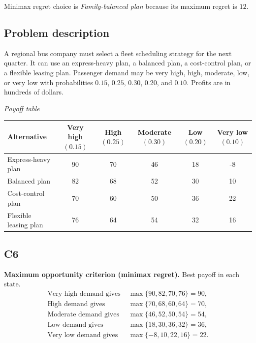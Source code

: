 \begin{ExamProblems}
		Minimax regret choice is \emph{Family-balanced plan} because its maximum regret is $12$.

		\item
		\subsection*{Problem description}
		A regional bus company must select a fleet scheduling strategy for the next quarter. It can use an express-heavy plan, a balanced plan, a cost-control plan, or a flexible leasing plan. Passenger demand may be very high, high, moderate, low, or very low with probabilities $0.15$, $0.25$, $0.30$, $0.20$, and $0.10$. Profits are in hundreds of dollars.

		\begin{center}
			\textit{Payoff table}\\
			\begin{tabular}{l c c c c c}
				\toprule
				Alternative & Very high $(0.15)$ & High $(0.25)$ & Moderate $(0.30)$ & Low $(0.20)$ & Very low $(0.10)$ \\
				\midrule
				Express-heavy plan & 90 & 70 & 46 & 18 & -8 \\
				Balanced plan & 82 & 68 & 52 & 30 & 10 \\
				Cost-control plan & 70 & 60 & 50 & 36 & 22 \\
				Flexible leasing plan & 76 & 64 & 54 & 32 & 16 \\
				\bottomrule
			\end{tabular}
		\end{center}

		\subsection*{C6}
		\textbf{Maximum opportunity criterion (minimax regret).} Best payoff in each state.
		\[
		\begin{aligned}
		\text{Very high demand gives } &\max\{90,82,70,76\}=90,\\
		\text{High demand gives } &\max\{70,68,60,64\}=70,\\
		\text{Moderate demand gives } &\max\{46,52,50,54\}=54,\\
		\text{Low demand gives } &\max\{18,30,36,32\}=36,\\
		\text{Very low demand gives } &\max\{-8,10,22,16\}=22.
		\end{aligned}
		\]


\end{ExamProblems}
